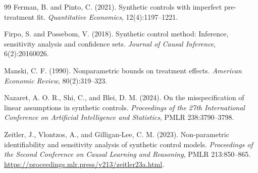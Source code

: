 \documentclass[11pt]{article}
\theoremstyle{definition}
\theoremstyle{plain}
\theoremstyle{remark}
\begin{document}
\begin{thebibliography}{99}
Ferman, B. and Pinto, C. (2021).
Synthetic controls with imperfect pre-treatment fit.
\emph{Quantitative Economics}, 12(4):1197--1221.

Firpo, S. and Possebom, V. (2018).
Synthetic control method: Inference, sensitivity analysis and confidence sets.
\emph{Journal of Causal Inference}, 6(2):20160026.

Manski, C. F. (1990).
Nonparametric bounds on treatment effects.
\emph{American Economic Review}, 80(2):319--323.

Nazaret, A. O. R., Shi, C., and Blei, D. M. (2024).
On the misspecification of linear assumptions in synthetic controls.
\emph{Proceedings of the 27th International Conference on Artificial
Intelligence and Statistics}, PMLR 238:3790--3798.

Zeitler, J., Vlontzos, A., and Gilligan-Lee, C. M. (2023).
Non-parametric identifiability and sensitivity analysis of synthetic control
models.
\emph{Proceedings of the Second Conference on Causal Learning and Reasoning},
PMLR 213:850--865.
\url{https://proceedings.mlr.press/v213/zeitler23a.html}.
\end{thebibliography}
\end{document}
